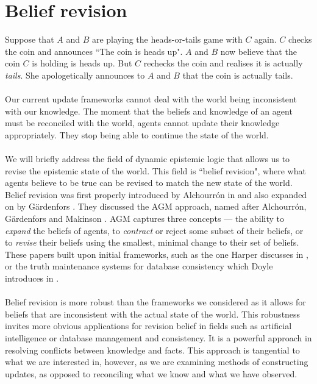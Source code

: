 \section{Belief revision}

Suppose that $A$ and $B$ are playing the heads-or-tails game with $C$ again.
$C$ checks the coin and announces ``The coin is heads up".
$A$ and $B$ now believe that the coin $C$ is holding is heads up.
But $C$ rechecks the coin and realises it is actually {\em tails}.
She apologetically announces to $A$ and $B$ that the coin is actually tails.\\
\\
Our current update frameworks cannot deal with the world being inconsistent with
our knowledge.
The moment that the beliefs and knowledge of an agent must be reconciled with
the world, agents cannot update their knowledge appropriately.
They stop being able to continue the state of the world.\\
\\
We will briefly address the field of dynamic epistemic logic that allows us to revise the epistemic state of the
world.
This field is ``belief revision", where what agents believe to be true can be
revised to match the new state of the world.
Belief revision was first properly introduced by Alchourr{\'o}n in \cite{theLogicOfTheoryChange} and also
expanded on by G{\"a}rdenfors \cite{gairdenfors1988knowledge}.
They discussed the AGM approach, named after Alchourr{\'o}n, G{\"a}rdenfors and Makinson
\cite{theLogicOfTheoryChange}.
AGM captures three concepts --- the ability to {\em expand} the beliefs of agents, to {\em contract}
or reject some subset of their beliefs, or to {\em revise} their beliefs using the smallest, minimal
change to their set of beliefs.
These papers built upon initial frameworks, such as the one Harper discusses in
\cite{harper1976rational}, or the truth maintenance systems for database
consistency which Doyle introduces in \cite{Doyle1979231}.\\
\\
Belief revision is more robust than the frameworks we considered as it allows
for beliefs that are inconsistent with the actual state of the world.
This robustness invites more obvious applications for revision belief in fields such as
artificial intelligence or database management and consistency.
It is a powerful approach in resolving conflicts between knowledge and facts.
This approach is tangential to what we are interested in, however, as we are
examining methods of constructing updates, as opposed to reconciling what we
know and what we have observed.

